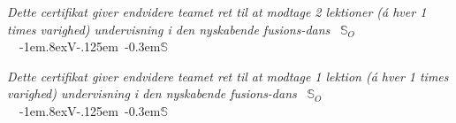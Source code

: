 \documentclass[danish]{article}
\makeatletter
\DeclareRobustCommand{\sovs}{
 \mbox{
  {\Large $\mathbb{S}_{O}$  }
  {\kern-1em\raise.8ex\hbox{V}\kern-.125em\@}
  {\kern-0.3em$\mathbb{S}$}
 }
}
\makeatother
\begin{document}
 \vspace{2cm}


{
  \setmainfont{Ink Free} 
    {\large
       {\textit{Dette certifikat giver endvidere teamet ret til at modtage 2 lektioner (á hver 1 times varighed) undervisning i den nyskabende fusions-dans}\sovs 
       
       }
   }
 }

 \vspace{2cm}

{
  \setmainfont{Ink Free} 
    {\large
       {\textit{Dette certifikat giver endvidere teamet ret til at modtage 1 lektion (á hver 1 times varighed) undervisning i den nyskabende fusions-dans} \sovs 
         }
   }
 }
\end{document}
